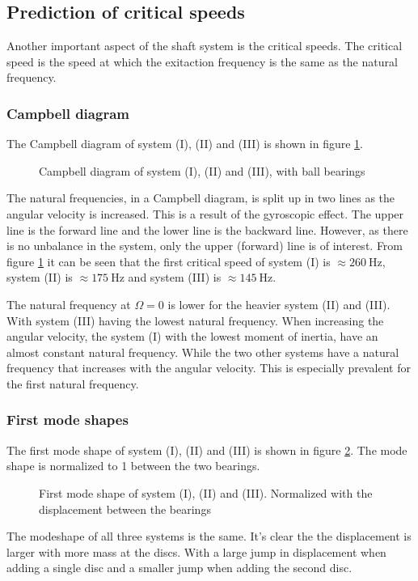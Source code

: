 \subsection{Prediction of critical speeds}
Another important aspect of the shaft system is the critical speeds. The critical speed is the speed at which the exitaction frequency is the same as the natural frequency.

\subsubsection{Campbell diagram}
The Campbell diagram of system (I), (II) and (III) is shown in figure \ref{fig:campbell_diagram}.
\begin{figure}[ht]
    \centering
    
    \caption{Campbell diagram of system (I), (II) and (III), with ball bearings}
    \label{fig:campbell_diagram}
\end{figure}
The natural frequencies, in a Campbell diagram, is split up in two lines as the angular velocity is increased. This is a result of the gyroscopic effect. The upper line is the forward line and the lower line is the backward line. However, as there is no unbalance in the system, only the upper (forward) line is of interest. From figure \ref{fig:campbell_diagram} it can be seen that the first critical speed of system (I) is $\approx \SI{260}{\hertz}$, system (II) is $\approx \SI{175}{\hertz}$ and system (III) is $\approx \SI{145}{\hertz}$.

The natural frequency at $\Omega = 0$ is lower for the heavier system (II) and (III). With system (III) having the lowest natural frequency. When increasing the angular velocity, the system (I) with the lowest moment of inertia, have an almost constant natural frequency. While the two other systems have a natural frequency that increases with the angular velocity. This is especially prevalent for the first natural frequency.

\subsubsection{First mode shapes}
The first mode shape of system (I), (II) and (III) is shown in figure \ref{fig:first_mode_shape}. The mode shape is normalized to 1 between the two bearings.
\begin{figure}[ht]
    \centering
    
    \caption{First mode shape of system (I), (II) and (III). Normalized with the displacement between the bearings}
    \label{fig:first_mode_shape}
\end{figure}
The modeshape of all three systems is the same. It's clear the the displacement is larger with more mass at the discs. With a large jump in displacement when adding a single disc and a smaller jump when adding the second disc.

